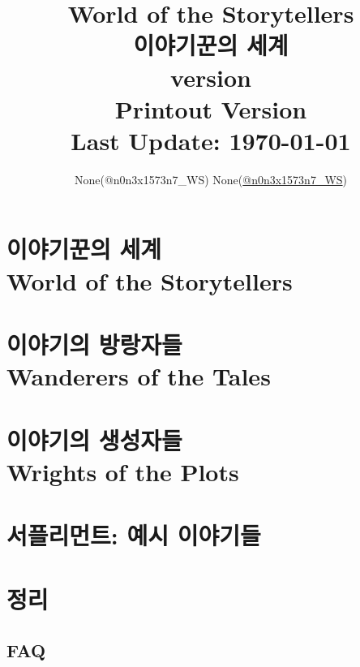 \documentclass[8pt,b5paper]{book}
\title{
	World of the Storytellers\\
	이야기꾼의 세계\\
	\large version \version\\
	\ifprintout
		Printout Version\\
	\else
		Last Update: \today
	\fi
	\ifDLC{\\ \textcolor{red}{DLC ENABLED}}\fi
}
\author{
	\ifprintout
		None(@n0n3x1573n7\_WS)
	\else
		None(\href{https://www.twitter.com/n0n3x1573n7_WS}{@n0n3x1573n7\_WS})
	\fi}
\date{}
\begin{document}
	\maketitle
	
%		
	
	\ifprintout
		\setcounter{tocdepth}{0}
	\else
		\setcounter{tocdepth}{-1}
	\fi
	
	\tableofcontents
	
	\part{이야기꾼의 세계 \\ World of the Storytellers}
		
	
	\part{이야기의 방랑자들 \\ Wanderers of the Tales}
		
	
	\part{이야기의 생성자들 \\ Wrights of the Plots}
		
	
	\ifprintout\else
	\part{서플리먼트: 예시 이야기들}
		
	\fi
	
	\ifprintout\else
	\part{정리}
	\fi
%			
		
		\ifprintout\else
		\chapter*{FAQ}
			
		\fi
		
\end{document}
